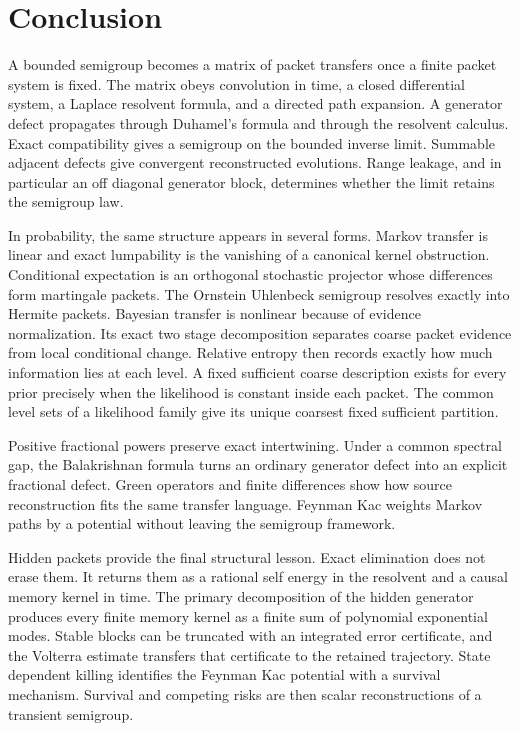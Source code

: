 \documentclass{aomart}
\theoremstyle{definition}
\theoremstyle{remark}
\begin{document}
\section{Conclusion}\label{sec:conclusion}

A bounded semigroup becomes a matrix of packet transfers once a finite packet system is fixed. The matrix obeys convolution in time, a closed differential system, a Laplace resolvent formula, and a directed path expansion. A generator defect propagates through Duhamel's formula and through the resolvent calculus. Exact compatibility gives a semigroup on the bounded inverse limit. Summable adjacent defects give convergent reconstructed evolutions. Range leakage, and in particular an off diagonal generator block, determines whether the limit retains the semigroup law.

In probability, the same structure appears in several forms. Markov transfer is linear and exact lumpability is the vanishing of a canonical kernel obstruction. Conditional expectation is an orthogonal stochastic projector whose differences form martingale packets. The Ornstein Uhlenbeck semigroup resolves exactly into Hermite packets. Bayesian transfer is nonlinear because of evidence normalization. Its exact two stage decomposition separates coarse packet evidence from local conditional change. Relative entropy then records exactly how much information lies at each level. A fixed sufficient coarse description exists for every prior precisely when the likelihood is constant inside each packet. The common level sets of a likelihood family give its unique coarsest fixed sufficient partition.

Positive fractional powers preserve exact intertwining. Under a common spectral gap, the Balakrishnan formula turns an ordinary generator defect into an explicit fractional defect. Green operators and finite differences show how source reconstruction fits the same transfer language. Feynman Kac weights Markov paths by a potential without leaving the semigroup framework.

Hidden packets provide the final structural lesson. Exact elimination does not erase them. It returns them as a rational self energy in the resolvent and a causal memory kernel in time. The primary decomposition of the hidden generator produces every finite memory kernel as a finite sum of polynomial exponential modes. Stable blocks can be truncated with an integrated error certificate, and the Volterra estimate transfers that certificate to the retained trajectory. State dependent killing identifies the Feynman Kac potential with a survival mechanism. Survival and competing risks are then scalar reconstructions of a transient semigroup.
\end{document}
